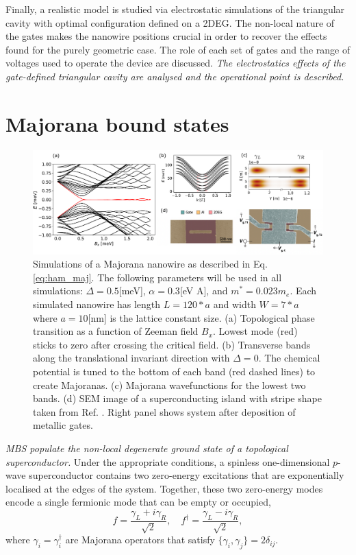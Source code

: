Finally, a realistic model is studied via electrostatic simulations of the triangular cavity with optimal configuration defined on a 2DEG.
The non-local nature of the gates makes the nanowire positions crucial in order to recover the effects found for the purely geometric case.
The role of each set of gates and the range of voltages used to operate the device are discussed.
\textit{The electrostatics effects of the gate-defined triangular cavity are analysed and the operational point is described.}


\section{Majorana bound states}

\begin{figure}[h!!]
\centering
  \includegraphics[width=0.95\linewidth]{figures/majorana_intro.pdf}
  \caption{Simulations of a Majorana nanowire as described in Eq. \eqref{eq:ham_maj}. The following parameters will be used in all simulations:  $\Delta=0.5$[meV], $\alpha=0.3$[eV A], and $m^*=0.023 m_e$. Each simulated nanowire has length $L=120*a$ and width $W=7*a$ where $a=10$[nm] is the lattice constant size. (a) Topological phase transition as a function of Zeeman field $B_x$. Lowest mode (red) sticks to zero after crossing the critical field. (b)  Transverse bands along the translational invariant direction with $\Delta=0$. The chemical potential is tuned to the bottom of each band (red dashed lines) to create Majoranas. (c) Majorana wavefunctions for the lowest two bands. (d) SEM image of a superconducting island with stripe shape taken from Ref. \cite{Moehle2021}. Right panel shows system after deposition of metallic gates.}
  \label{fig:rectangular_cavity}
\end{figure}

\textit{MBS populate the non-local degenerate ground state of a topological superconductor.}
Under the appropriate conditions, a spinless one-dimensional $p$-wave superconductor contains two zero-energy excitations that are exponentially localised at the edges of the system. 
Together, these two zero-energy modes encode a single fermionic mode that can be empty or occupied, 
\begin{equation}
f = \frac{\gamma_{L} + i\gamma_{R}}{\sqrt{2}}, \quad f^{\dagger} = \frac{\gamma_{L} - i \gamma_{R}}{\sqrt{2}},
\end{equation}
where $\gamma_{i} = \gamma_{i}^{\dagger}$ are Majorana operators that satisfy $\{ \gamma_{i}, \gamma_{j} \} = 2\delta_{ij}$.

